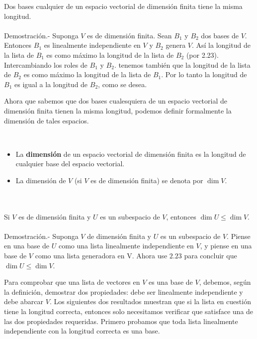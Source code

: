 \begin{myteo}
    Dos bases cualquier de un espacio vectorial de dimensión finita  tiene la misma longitud.\\\\
	Demostración.-\; Suponga $V$ es de dimensión finita. Sean $B_1$ y $B_2$ dos bases de $V$. Entonces $B_1$ es linealmente independiente en $V$ y $B_2$ genera $V$. Así la longitud de la lista de $B_1$ es como máximo la longitud de la lista de $B_2$ (por 2.23). Intercambiando los roles de $B_1$ y $B_2$. tenemos también que la longitud de la lista de $B_2$ es como máximo la longitud de la lista de $B_1$. Por lo tanto la longitud de $B_1$ es igual a la longitud de $B_2$, como se desea.
\end{myteo}

Ahora que sabemos que dos bases cualesquiera de un espacio vectorial de dimensión finita tienen la misma longitud, podemos definir formalmente la dimensión de tales espacios.

\begin{mydef}\;\\
    \begin{itemize}
	\item La \textbf{dimensión} de un espacio vectorial de dimensión finita es la longitud de cualquier base del espacio vectorial.
	\item La dimensión de $V$ (si $V$ es de dimensión finita) se denota por $\dim V$.
    \end{itemize}
\end{mydef}

\setcounter{myteo}{37}
\begin{myteo}\, \\\\
    Si $V$ es de dimensión finita y $U$ es un subespacio de $V$, entonces $\dim U\leq \dim V$.\\\\
	Demostración.-\; Suponga $V$ de dimensión finita y $U$ es un subespacio de $V$. Piense en una base de $U$ como una lista linealmente independiente en $V$, y piense en una base de $V$ como una lista generadora en V. Ahora use $2.23$ para concluir que $\dim U\leq \dim V$.
\end{myteo}

Para comprobar que una lista de vectores en $V$ es una base de $V$, debemos, según la definición, demostrar dos propiedades: debe ser linealmente independiente y debe abarcar $V$. Los siguientes dos resultados muestran que si la lista en cuestión tiene la longitud correcta, entonces solo necesitamos verificar que satisface una de las dos propiedades requeridas. Primero probamos que toda lista linealmente independiente con la longitud correcta es una base.

